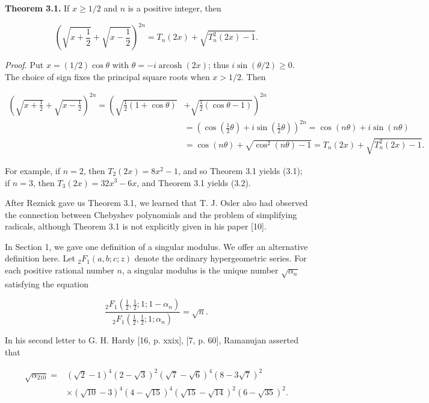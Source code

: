 \documentclass[11pt,letterpaper]{article}
\begin{document}
\noindent\textbf{Theorem 3.1.} If $x \geq 1 / 2$ and $n$ is a positive integer, then

\[
\left(\sqrt{x+\frac{1}{2}}+\sqrt{x-\frac{1}{2}}\right)^{2 n}=T_{n}(2 x)+\sqrt{T_{n}^{2}(2 x)-1} .
\]

\noindent\textit{Proof.} Put $x=(1/2)\cos\theta$ with $\theta=-i\operatorname{arcosh}(2x)$; thus $i\sin(\theta/2)\geq0$. The choice of sign fixes the principal square roots when $x>1/2$. Then

\[
\begin{aligned}
\left(\sqrt{x+\frac{1}{2}}+\sqrt{x-\frac{1}{2}}\right)^{2 n}=\left(\sqrt{\frac{1}{2}(1+\cos \theta)}\right. & \left.+\sqrt{\frac{1}{2}(\cos \theta-1)}\right)^{2 n} \\
& =\left(\cos \left(\frac{1}{2} \theta\right)+i \sin \left(\frac{1}{2} \theta\right)\right)^{2 n}=\cos (n \theta)+i \sin (n \theta) \\
& =\cos (n \theta)+\sqrt{\cos ^{2}(n \theta)-1}=T_{n}(2 x)+\sqrt{T_{n}^{2}(2 x)-1} .
\end{aligned}
\]

For example, if $n=2$, then $T_{2}(2 x)=8 x^{2}-1$, and so Theorem 3.1 yields (3.1); if $n=3$, then $T_{3}(2 x)=32 x^{3}-6 x$, and Theorem 3.1 yields (3.2).

After Reznick gave us Theorem 3.1, we learned that T. J. Osler also had observed the connection between Chebyshev polynomials and the problem of simplifying radicals, although Theorem 3.1 is not explicitly given in his paper [10].

In Section 1, we gave one definition of a singular modulus. We offer an alternative definition here. Let ${ }_{2} F_{1}(a, b ; c ; z)$ denote the ordinary hypergeometric series. For each positive rational number $n$, a singular modulus is the unique number $\sqrt{\alpha_{n}}$ satisfying the equation

\[
\frac{{ }_{2} F_{1}\left(\frac{1}{2}, \frac{1}{2} ; 1 ; 1-\alpha_{n}\right)}{{ }_{2} F_{1}\left(\frac{1}{2}, \frac{1}{2} ; 1 ; \alpha_{n}\right)}=\sqrt{n} .
\]

In his second letter to G. H. Hardy [16, p. xxix], [7, p. 60], Ramanujan asserted that

\[
\begin{aligned}
\sqrt{\alpha_{210}}= & (\sqrt{2}-1)^{4}(2-\sqrt{3})^{2}(\sqrt{7}-\sqrt{6})^{4}(8-3 \sqrt{7})^{2} \\
& \times(\sqrt{10}-3)^{4}(4-\sqrt{15})^{4}(\sqrt{15}-\sqrt{14})^{2}(6-\sqrt{35})^{2} .
\end{aligned}
\]
\end{document}
